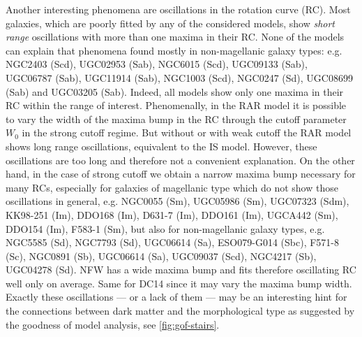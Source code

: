 Another interesting phenomena are oscillations in the rotation curve (RC). Most galaxies, which are poorly fitted by any of the considered models, show \textit{short range} oscillations with more than one maxima in their RC. None of the models can explain that phenomena found mostly in non-magellanic galaxy types: e.g. NGC2403 (Scd), UGC02953 (Sab), NGC6015 (Scd), UGC09133 (Sab), UGC06787 (Sab), UGC11914 (Sab), NGC1003 (Scd), NGC0247 (Sd), UGC08699 (Sab) and UGC03205 (Sab). Indeed, all models show only one maxima in their RC within the range of interest. Phenomenally, in the RAR model it is possible to vary the width of the maxima bump in the RC through the cutoff parameter $W_0$ in the strong cutoff regime. But without or with weak cutoff the RAR model shows long range oscillations, equivalent to the IS model. However, these oscillations are too long and therefore not a convenient explanation. On the other hand, in the case of strong cutoff we obtain a narrow maxima bump necessary for many RCs, especially for galaxies of magellanic type which do not show those oscillations in general, e.g. NGC0055 (Sm), UGC05986 (Sm), UGC07323 (Sdm), KK98-251 (Im), DDO168 (Im), D631-7 (Im), DDO161 (Im), UGCA442 (Sm), DDO154 (Im), F583-1 (Sm), but also for non-magellanic galaxy types, e.g. NGC5585 (Sd), NGC7793 (Sd), UGC06614 (Sa), ESO079-G014 (Sbc), F571-8 (Sc), NGC0891 (Sb), UGC06614 (Sa), UGC09037 (Scd), NGC4217 (Sb), UGC04278 (Sd). NFW has a wide maxima bump and fits therefore oscillating RC well only on average. Same for DC14 since it may vary the maxima bump width. Exactly these oscillations --- or a lack of them --- may be an interesting hint for the connections between dark matter and the morphological type as suggested by the goodness of model analysis, see \cref{fig:gof-stairs}.
